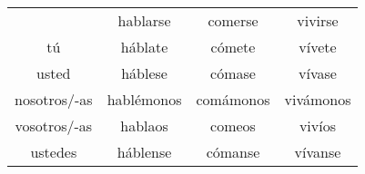 \begin{tabular}{cccc}
\hline
~              & hablarse   & comerse    & vivirse      \\
tú             & háblate    & cómete     & vívete       \\
usted          & háblese    & cómase     & vívase       \\
nosotros/-as   & hablémonos & comámonos  & vivámonos    \\
vosotros/-as   & hablaos    & comeos     & vivíos       \\
ustedes        & háblense   & cómanse    & vívanse      \\
\hline
\end{tabular}